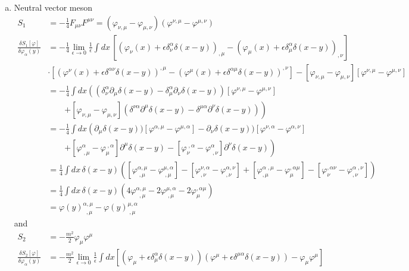 \documentclass[../main.tex]{subfiles}
\begin{document}
\begin{enumerate}[(a)]
\item Neutral vector meson
\begin{align}
S_1&=-\frac{1}{4}F_{\mu\nu}F^{\mu\nu}=(\varphi_{\nu,\mu}-\varphi_{\mu,\nu})(\varphi^{\nu,\mu}-\varphi^{\mu,\nu})\\
\frac{\delta S_1[\varphi]}{\delta\varphi_\alpha(y)}&=-\frac{1}{4}\lim_{\epsilon\rightarrow0}\frac{1}{\epsilon}\int dx\,
[(\varphi_{\nu}(x)+\epsilon\delta^\alpha_\nu\delta(x-y))_{,\mu}-(\varphi_{\mu}(x)+\epsilon\delta^\alpha_\mu\delta(x-y))_{,\nu}]\\
%
&\cdot[(\varphi^{\nu}(x)+\epsilon\delta^{\alpha\nu}\delta(x-y))^{,\mu}-(\varphi^{\mu}(x)+\epsilon\delta^{\alpha\mu}\delta(x-y))^{,\nu}]-
[\varphi_{\nu,\mu}-\varphi_{\mu,\nu}]
[\varphi^{\nu,\mu}-\varphi^{\mu,\nu}]\\
%
&=-\frac{1}{4}\int dx\left((\delta_\nu^\alpha\partial_\mu\delta(x-y)-\delta_\mu^\alpha\partial_\nu\delta(x-y))[\varphi^{\nu,\mu}-\varphi^{\mu,\nu}]\right.\\
&\qquad\left.+[\varphi_{\nu,\mu}-\varphi_{\mu,\nu}](\delta^{\nu\alpha}\partial^\mu\delta(x-y)-\delta^{\mu\alpha}\partial^\nu\delta(x-y))\right)\\
&=-\frac{1}{4}\int dx\left(
 \partial_\mu\delta(x-y))[\varphi^{\alpha,\mu}-\varphi^{\mu,\alpha}]
-\partial_\nu\delta(x-y))[\varphi^{\nu,\alpha}-\varphi^{\alpha,\nu}]\right.\\
&\qquad\left.
+[\varphi^\alpha_{\;,\mu}-\varphi_{\mu}^{\;,\alpha}]\partial^\mu\delta(x-y)
-[\varphi_{\nu}^{\;,\alpha}-\varphi^{\alpha}_{\;,\nu}]\partial^\nu\delta(x-y)
\right)\\
&=\frac{1}{4}\int dx\,\delta(x-y)\left(
[\varphi^{\alpha,\mu}_{\;,\mu}-\varphi^{\mu,\alpha}_{\;,\mu}]
-[\varphi^{\nu,\alpha}_{,\nu}-\varphi^{\alpha,\nu}_{,\nu}]
+[\varphi^{\alpha\;,\mu}_{,\mu}-\varphi_{\mu}^{,\alpha\mu}]
-[\varphi_{\nu}^{,\alpha\nu}-\varphi^{\alpha\;,\nu}_{,\nu}]
\right)\\
&=\frac{1}{4}\int dx\,\delta(x-y)\left(
4\varphi^{\alpha,\mu}_{\;\;,\mu}-
2\varphi^{\mu,\alpha}_{\;,\mu}-
2\varphi_{\mu}^{,\alpha\mu}
\right)\\
&=\varphi(y)^{\alpha,\mu}_{\;\;,\mu}-\varphi(y)^{\mu,\alpha}_{\;,\mu}
\end{align}
and
\begin{align}
S_2&=-\frac{m^2}{2}\varphi_\mu\varphi^\mu\\
\frac{\delta S_2[\varphi]}{\delta\varphi_\alpha(y)}&=-\frac{m^2}{2}
\lim_{\epsilon\rightarrow0}\frac{1}{\epsilon}\int dx
\left[(\varphi_\mu+\epsilon\delta_\mu^\alpha\delta(x-y))(\varphi^\mu+\epsilon\delta^{\mu\alpha}\delta(x-y))-\varphi_\mu\varphi^\mu\right]\\

\end{align}
\end{enumerate}
\end{document}
